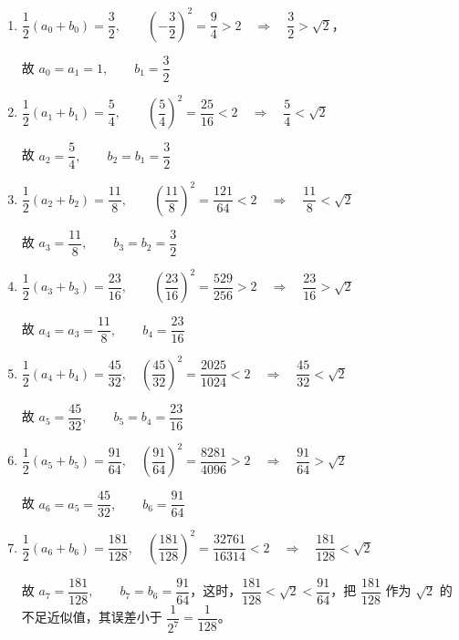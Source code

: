 \begin{enumerate}
    \item  $\dfrac{1}{2}\left(a_{0}+b_{0}\right)=\dfrac{3}{2},\qquad \left(-\dfrac{3}{2}\right)^{2}=\dfrac{9}{4}>2 \quad\Rightarrow\quad\dfrac{3}{2}>\sqrt{2}$，
    
    故 $a_{0}=a_{1}=1,\qquad   b_{1}=\dfrac{3}{2}$

    \item   $\dfrac{1}{2}\left(a_{1}+b_{1}\right)=\dfrac{5}{4},\qquad \left(\dfrac{5}{4}\right)^{2}=\dfrac{25}{16}<2 \quad\Rightarrow\quad \dfrac{5}{4}<\sqrt{2}$
    
    故 $a_{2}=\dfrac{5}{4}, \qquad  b_{2}=b_{1}=\dfrac{3}{2}$

    \item  $\dfrac{1}{2}\left(a_{2}+b_{2}\right)=\dfrac{11}{8},\qquad \left(\dfrac{11}{8}\right)^{2}=\dfrac{121}{64}<2 \quad\Rightarrow\quad \dfrac{11}{8}<\sqrt{2}$
    
    故 $a_{3}=\dfrac{11}{8},\qquad  b_{3}=b_{2}=\dfrac{3}{2}$

    \item   $\dfrac{1}{2}\left(a_{3}+b_{3}\right)=\dfrac{23}{16},\qquad \left(\dfrac{23}{16}\right)^{2}=\dfrac{529}{256}>2 \quad\Rightarrow\quad \dfrac{23}{16}>\sqrt{2}$
    
    故 $a_{4}=a_{3}=\dfrac{11}{8},\qquad  b_{4}=\dfrac{23}{16}$

    \item  $\dfrac{1}{2}\left(a_{4}+b_{4}\right)=\dfrac{45}{32},\quad \left(\dfrac{45}{32}\right)^{2}=\dfrac{2025}{1024}<2 \quad\Rightarrow\quad \dfrac{45}{32}<\sqrt{2}$
    
     故 $a_{5}=\dfrac{45}{32}, \qquad b_{5}=b_{4}=\dfrac{23}{16}
    $
    
    \item  $\dfrac{1}{2}\left(a_{5}+b_{5}\right)=\dfrac{91}{64},\quad \left(\dfrac{91}{64}\right)^{2}=\dfrac{8281}{4096}>2 \quad\Rightarrow\quad \dfrac{91}{64}>\sqrt{2}$
    
     故 $a_{6}=a_{5}=\dfrac{45}{32}, \qquad b_{6}=\dfrac{91}{64}$

    
    \item  $\dfrac{1}{2}\left(a_{6}+b_{6}\right)=\dfrac{181}{128},\quad \left(\dfrac{181}{128}\right)^{2}=\dfrac{32761}{16314}<2 \quad\Rightarrow\quad \dfrac{181}{128}<\sqrt{2}$
    
    {\linespread{1.9}\selectfont 故 $a_{7}=\dfrac{181}{128}, \qquad b_{7}=b_{6}=\dfrac{91}{64}$，这时，$\dfrac{181}{128}<\sqrt{2}<\dfrac{91}{64}$，把 $\dfrac{181}{128}$ 作为 $\sqrt{2}$ 的不足近似值，其误差小于 $\dfrac{1}{2^7}=\dfrac{1}{128}$。\par}
\end{enumerate}

